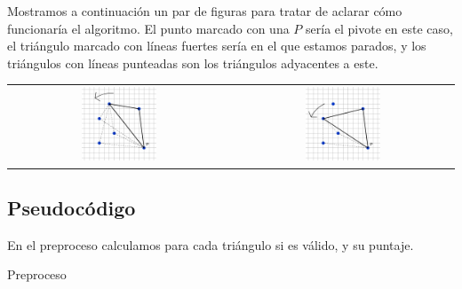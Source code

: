 Mostramos a continuación un par de figuras para tratar de aclarar cómo funcionaría 
el algoritmo. El punto marcado con una $P$ sería el pivote en este caso, el triángulo 
marcado con líneas fuertes sería en el que estamos parados, y los triángulos con líneas punteadas 
son los triángulos adyacentes a este. 

\begin{center}
\begin{tabular}{cc}
  \includegraphics[width=0.35\textwidth]{ej3_2.jpg} &

  \includegraphics[width=0.35\textwidth]{ej3_3.jpg}
\end{tabular}
\end{center}

\subsection{Pseudocódigo}

En el preproceso calculamos para cada triángulo si es válido, y su puntaje. 

\begin{algorithm}[H]
\caption{Preproceso}
\end{algorithm}

